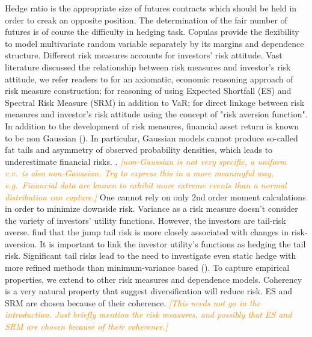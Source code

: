 \documentclass[11pt,a4paper,english]{article}
\providecommand{\natp}[1]{\textcolor{darkorange}{#1}}
\begin{document}
 Hedge ratio is the appropriate size of futures contracts which should be held in order to creak an opposite position. The determination of the fair number of futures is of course the difficulty in hedging task.
Copulas provide the flexibility to model multivariate random variable
separately by its margins and dependence structure. 
Different risk measures accounts for investors' risk attitude.
Vast literature discussed the relationship between risk measures and investor's risk attitude, we refer readers to
\citet{artzner1999coherent} for an axiomatic, economic reasoning approach of risk measure construction;
\citet{embrechts2002correlation} for reasoning of using Expected Shortfall (ES) and Spectral Risk Measure (SRM) in addition to VaR;
\citet{Acerbi2002} for direct linkage between risk measures and investor's risk attitude using the concept of "risk aversion function".
In addition to the development of risk measures, financial asset return is known to be non Gaussian (\citealp{fama1963mandelbrot}). In particular, Gaussian models cannot produce so-called fat tails and asymmetry of observed probability densities, which leads to underestimate financial risks. \natp{\cite{Cont2001}}. \natp{\em [non-Gaussian is not
  very specific, a uniform r.v.\ is also non-Gaussian. Try to express
  this in a more meaningful way, e.g.\ Financial data are known to
  exhibit more extreme events than a normal distribution can capture.]}
One cannot rely on only 2nd order moment calculations in order to
minimize downside risk. Variance as a risk measure doesn't consider the variety of investors' utility functions. However, the investors are tail-risk averse. \citet{bollerslev2015tail} find that the jump tail risk is more closely associated with changes in risk-aversion. It is important to link the investor utility's functions as hedging the tail risk. Significant tail risks lead to the need to investigate even static hedge with more refined methods than minimum-variance based (\citealp{ederington2008minimum}). 
To capture empirical properties, we extend to other risk measures and dependence models. Coherency is a very natural property that suggest diversification will
reduce risk. ES and SRM are chosen because of their coherence. \natp{\em [This needs not go in the introduction. Just briefly mention the risk measures, and possibly that ES and SRM are chosen because of their coherence.]}
\medskip
\end{document}
